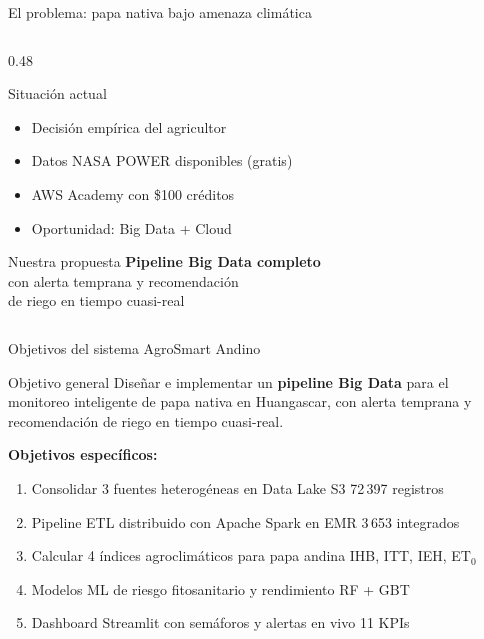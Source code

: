\documentclass[14pt,aspectratio=169]{beamer}
\begin{document}
\begin{frame}{El problema: papa nativa bajo amenaza clim\'atica}
\begin{columns}[T]
\begin{column}{0.48\textwidth}
\begin{exampleblock}{Situaci\'on actual}
        \begin{itemize}
          \item Decisi\'on emp\'irica del agricultor
          \item Datos NASA POWER disponibles (gratis)
          \item AWS Academy con \$100 cr\'editos
          \item Oportunidad: Big Data + Cloud
        \end{itemize}
      \end{exampleblock}
      \vspace{0.4em}
      \begin{block}{Nuestra propuesta}
        \centering
        \textbf{Pipeline Big Data completo}\\
        con alerta temprana y recomendaci\'on\\
        de riego en tiempo cuasi-real
      \end{block}
    \end{column}
  \end{columns}
\end{frame}

\begin{frame}{Objetivos del sistema AgroSmart Andino}
  \begin{block}{Objetivo general}
    Dise\~nar e implementar un \textbf{pipeline Big Data} para el
    monitoreo inteligente de papa nativa en Huangascar, con alerta
    temprana y recomendaci\'on de riego en tiempo cuasi-real.
  \end{block}
  \vspace{0.4em}
  \textbf{Objetivos espec\'ificos:}
  \begin{enumerate}
    \item Consolidar 3 fuentes heterog\'eneas en Data Lake S3
      \hfill{\footnotesize 72\,397 registros}
    \item Pipeline ETL distribuido con Apache Spark en EMR
      \hfill{\footnotesize 3\,653 integrados}
    \item Calcular 4 \'indices agroclim\'aticos para papa andina
      \hfill{\footnotesize IHB, ITT, IEH, ET$_0$}
    \item Modelos ML de riesgo fitosanitario y rendimiento
      \hfill{\footnotesize RF + GBT}
    \item Dashboard Streamlit con sem\'aforos y alertas en vivo
      \hfill{\footnotesize 11 KPIs}
  \end{enumerate}
\end{frame}
\end{document}
